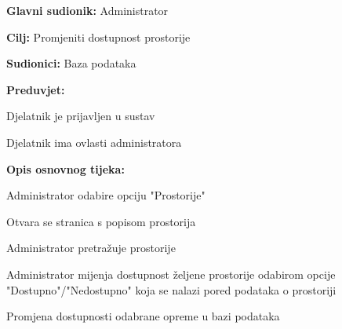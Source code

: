 				\noindent {}
				\begin{packed_item}
					
					\item \textbf{Glavni sudionik: }Administrator
					\item  \textbf{Cilj: }Promjeniti dostupnost prostorije
					\item  \textbf{Sudionici: }Baza podataka
					\item  \textbf{Preduvjet: }
					\item[] \begin{packed_enum}
						
						\item[-] Djelatnik je prijavljen u sustav
						\item[-] Djelatnik ima ovlasti administratora
					\end{packed_enum}
					\item  \textbf{Opis osnovnog tijeka: }
					
					\item[] \begin{packed_enum}
						\item Administrator odabire opciju "Prostorije"
						\item Otvara se stranica s popisom prostorija
						\item Administrator pretražuje prostorije
						\item Administrator mijenja dostupnost željene prostorije odabirom opcije "Dostupno"/"Nedostupno" koja se nalazi pored podataka o prostoriji
						\item Promjena dostupnosti odabrane opreme u bazi podataka
					\end{packed_enum}
					
				\end{packed_item}
				
